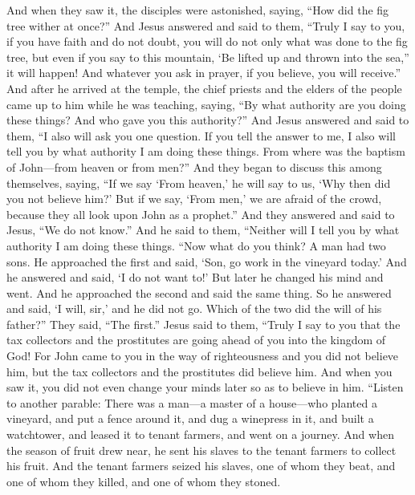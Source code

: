 \begin{biblechapter}
\verse And when they saw it, the disciples were astonished, saying, “How did the fig tree wither at once?”
\verse And Jesus answered and said to them, “Truly I say to you, if you have faith and do not doubt, you will do not only what was done to the fig tree, but even if you say to this mountain, ‘Be lifted up and thrown into the sea,” it will happen!
\verse And whatever you ask in prayer, if you believe, you will receive.”
 And after he arrived at the temple, the chief priests and the elders of the people came up to him while he was teaching, saying, “By what authority are you doing these things? And who gave you this authority?”
\verse And Jesus answered and said to them, “I also will ask you one question. If you tell the answer to me, I also will tell you by what authority I am doing these things.
\verse From where was the baptism of John—from heaven or from men?” And they began to discuss this among themselves, saying, “If we say ‘From heaven,’ he will say to us, ‘Why then did you not believe him?’
\verse But if we say, ‘From men,’ we are afraid of the crowd, because they all look upon John as a prophet.”
\verse And they answered and said to Jesus, “We do not know.” And he said to them, “Neither will I tell you by what authority I am doing these things.
 “Now what do you think? A man had two sons. He approached the first and said, ‘Son, go work in the vineyard today.’
\verse And he answered and said, ‘I do not want to!’ But later he changed his mind and went.
\verse And he approached the second and said the same thing. So he answered and said, ‘I will, sir,’ and he did not go.
\verse Which of the two did the will of his father?” They said, “The first.” Jesus said to them, “Truly I say to you that the tax collectors and the prostitutes are going ahead of you into the kingdom of God!
\verse For John came to you in the way of righteousness and you did not believe him, but the tax collectors and the prostitutes did believe him. And when you saw it, you did not even change your minds later so as to believe in him.
 “Listen to another parable: There was a man—a master of a house—who planted a vineyard, and put a fence around it, and dug a winepress in it, and built a watchtower, and leased it to tenant farmers, and went on a journey.
\verse And when the season of fruit drew near, he sent his slaves to the tenant farmers to collect his fruit.
\verse And the tenant farmers seized his slaves, one of whom they beat, and one of whom they killed, and one of whom they stoned.

\end{biblechapter}
